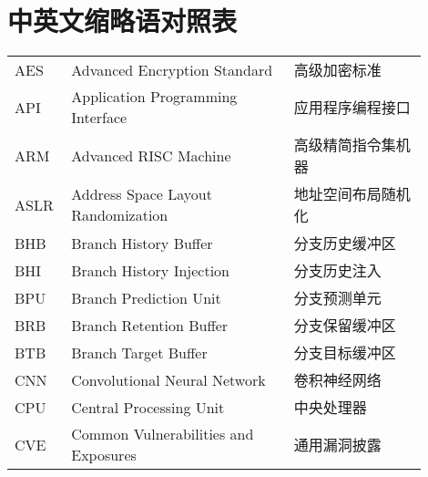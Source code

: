 %
%

\chapter{中英文缩略语对照表}

\begin{center}
\renewcommand\arraystretch{1.5}
\setlength{\tabcolsep}{4pt}
\begin{tabular}{p{0.1\linewidth}p{0.5\linewidth}p{0.3\linewidth}}
AES & Advanced Encryption Standard & 高级加密标准 \\
API & Application Programming Interface & 应用程序编程接口 \\
ARM & Advanced RISC Machine & 高级精简指令集机器 \\
ASLR & Address Space Layout Randomization & 地址空间布局随机化 \\

BHB & Branch History Buffer & 分支历史缓冲区 \\
BHI & Branch History Injection & 分支历史注入 \\
BPU & Branch Prediction Unit & 分支预测单元 \\
BRB & Branch Retention Buffer & 分支保留缓冲区 \\
BTB & Branch Target Buffer & 分支目标缓冲区 \\

CNN & Convolutional Neural Network & 卷积神经网络 \\
CPU & Central Processing Unit & 中央处理器 \\
CVE & Common Vulnerabilities and Exposures & 通用漏洞披露 \\
\end{tabular}
\end{center}
